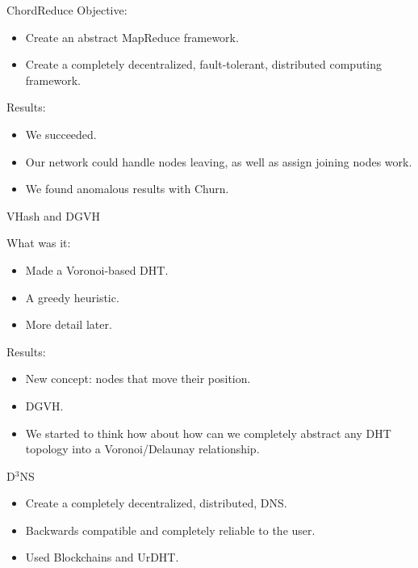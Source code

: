 \documentclass[11pt]{beamer}
\begin{document}
\begin{frame}{ChordReduce}
Objective:
\begin{itemize}
	\item Create an abstract MapReduce framework.
	\item Create a completely decentralized, fault-tolerant, distributed computing framework. 

\end{itemize}

Results:
\begin{itemize}
	\item We succeeded.
	\item Our network could handle nodes leaving, as well as assign joining nodes work.
	\item We found anomalous results with Churn.
\end{itemize}


\end{frame}

\begin{frame}{VHash and DGVH}



What was it:
\begin{itemize}
	\item Made a Voronoi-based DHT.
	\item A greedy heuristic.
	\item More detail later.
\end{itemize}


Results:
\begin{itemize}
	\item New concept: nodes that move their position.
	\item DGVH.
	\item We started to think how about how can we completely abstract any DHT topology into a Voronoi/Delaunay relationship.
\end{itemize}

\end{frame}


\begin{frame}{D$^3$NS}

\begin{itemize}
	\item Create a completely decentralized, distributed, DNS.
	\item Backwards compatible and completely reliable to the user.
	\item Used Blockchains and UrDHT.
\end{itemize}
\end{frame}
\end{document}
